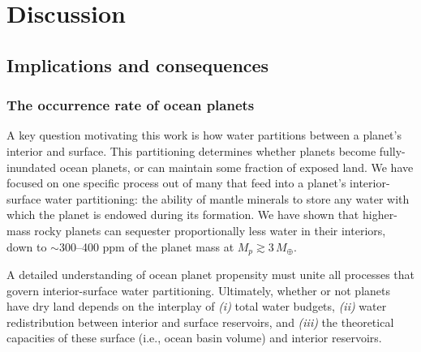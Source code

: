 \section{Discussion}\label{sec:discussion-water}

\subsection{Implications and consequences}

\subsubsection{The occurrence rate of ocean planets}\label{sec:discussion-waterworld}

A key question motivating this work is how water partitions between a planet's interior and surface. This partitioning determines whether planets become fully-inundated ocean planets, or can maintain some fraction of exposed land. We have focused on one specific process out of many that feed into a planet's interior-surface water partitioning: the ability of mantle minerals to store any water with which the planet is endowed during its formation. We have shown that higher-mass rocky planets can sequester proportionally less water in their interiors, down to $\sim$300--400 ppm of the planet mass at $M_p \gtrsim 3\,M_\oplus$.


A detailed understanding of ocean planet propensity must unite all processes that govern interior-surface water partitioning. Ultimately, whether or not planets have dry land depends on the interplay of \textit{(i)} total water budgets, \textit{(ii)} water redistribution between interior and surface reservoirs, and \textit{(iii)} the theoretical capacities of these surface (i.e., ocean basin volume) and interior reservoirs. 

